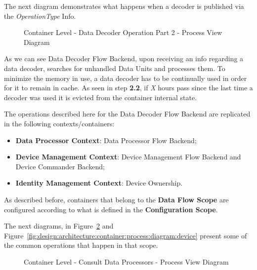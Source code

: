 The next diagram demonstrates what happens when a decoder is published via the \textit{OperationType} Info.

\begin{figure}[H]
   \centering
   \resizebox{\columnwidth}{!}
   {      
      
   }
   \caption[Container Level - Data Decoder Operation Part 2 - Process View Diagram]{Container Level - Data Decoder Operation Part 2 - Process View Diagram}
   \label{fig:design:architecture:container:process:diagram:decoder:2}
\end{figure}

As we can see Data Decoder Flow Backend, upon receiving an info regarding a data decoder, searches for unhandled Data Units and processes them.
To minimize the memory in use, a data decoder has to be continually used in order for it to remain in cache. As seen in step \textbf{2.2}, if \textit{X} hours pass since the last time a decoder was used it is evicted from the container internal state.

The operations described here for the Data Decoder Flow Backend are replicated in the following contexts/containers:

\begin{itemize}
   \item \textbf{Data Processor Context}: Data Processor Flow Backend;
   \item \textbf{Device Management Context}: Device Management Flow Backend and Device Commander Backend;
   \item \textbf{Identity Management Context}: Device Ownership.
\end{itemize}

As described before, containers that belong to the \textbf{Data Flow Scope} are configured according to what is defined in the \textbf{Configuration Scope}.

The next diagrams, in Figure~\ref{fig:design:architecture:container:process:diagram:processor} and Figure~\ref{fig:design:architecture:container:process:diagram:device} present some of the common operations that happen in that scope.

\begin{figure}[H]
   \centering
   \resizebox{\columnwidth}{!}
   {      
      
   }
   \caption[Container Level - Consult Data Processors - Process View Diagram]{Container Level - Consult Data Processors - Process View Diagram}
   \label{fig:design:architecture:container:process:diagram:processor}
\end{figure}

